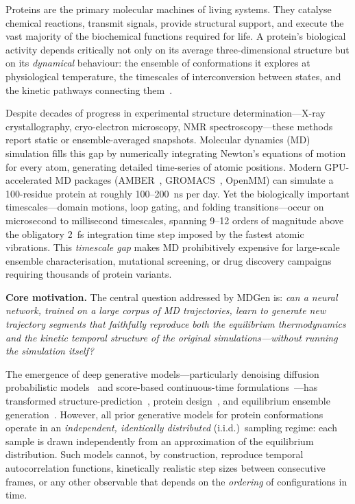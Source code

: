 \documentclass[11pt,a4paper]{article}
\begin{document}
Proteins are the primary molecular machines of living systems.  They catalyse chemical reactions,
transmit signals, provide structural support, and execute the vast majority of the biochemical
functions required for life.  A protein's biological activity depends critically not only on its
average three-dimensional structure but on its \emph{dynamical} behaviour: the ensemble of
conformations it explores at physiological temperature, the timescales of interconversion between
states, and the kinetic pathways connecting them~\cite{adcock2006}.

Despite decades of progress in experimental structure determination---X-ray crystallography,
cryo-electron microscopy, NMR spectroscopy---these methods report static or ensemble-averaged
snapshots.  Molecular dynamics (MD) simulation fills this gap by numerically integrating Newton's
equations of motion for every atom, generating detailed time-series of atomic positions.  Modern
GPU-accelerated MD packages (AMBER~\cite{case2021}, GROMACS~\cite{abraham2015}, OpenMM) can
simulate a 100-residue protein at roughly 100--200~ns per day.  Yet the biologically important
timescales---domain motions, loop gating, and folding transitions---occur on microsecond to
millisecond timescales, spanning 9--12 orders of magnitude above the obligatory 2~fs integration
time step imposed by the fastest atomic vibrations.  This \emph{timescale gap} makes MD
prohibitively expensive for large-scale ensemble characterisation, mutational screening, or drug
discovery campaigns requiring thousands of protein variants.

\begin{calloutbox}
  \textbf{Core motivation.}  The central question addressed by MDGen is: \emph{can a neural
  network, trained on a large corpus of MD trajectories, learn to generate new trajectory segments
  that faithfully reproduce both the equilibrium thermodynamics and the kinetic temporal structure
  of the original simulations---without running the simulation itself?}
\end{calloutbox}

The emergence of deep generative models---particularly denoising diffusion probabilistic
models~\cite{ho2020} and score-based continuous-time formulations~\cite{song2021}---has
transformed structure-prediction~\cite{jumper2021}, protein design~\cite{watson2023}, and
equilibrium ensemble generation~\cite{jing2023eigenfold,jing2024alphaflow}.  However, all prior
generative models for protein conformations operate in an \emph{independent, identically
distributed} (i.i.d.)\ sampling regime: each sample is drawn independently from an approximation
of the equilibrium distribution.  Such models cannot, by construction, reproduce temporal
autocorrelation functions, kinetically realistic step sizes between consecutive frames, or any
other observable that depends on the \emph{ordering} of configurations in time.
\end{document}
